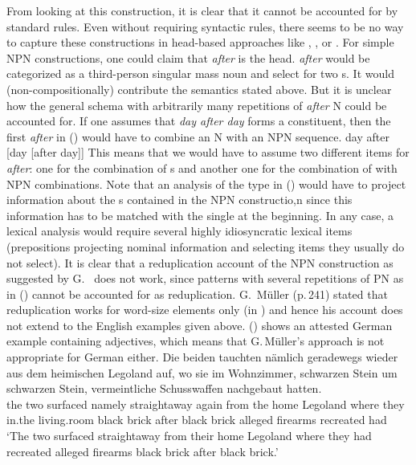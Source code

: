 \documentclass[output=paper
	        ,collection
	        ,collectionchapter
 	        ,biblatex
                ,babelshorthands
                ,newtxmath
                ,draftmode
                ,colorlinks, citecolor=brown
]{langscibook}
\begin{document}
From looking at this construction, it is clear that it cannot be accounted for by standard \xbar
rules. Even without requiring \xbar syntactic rules, there seems to be no way to capture these
constructions in head-based approaches like \minimalism, \cg, or \dg. For simple NPN constructions,
one could claim that \emph{after} is the head. \emph{after} would be categorized as a third-person singular
mass noun and select for two \nbar{}s. It would (non-compositionally) contribute the semantics stated above. But it is unclear how the general schema with arbitrarily
many repetitions of \emph{after} N could be accounted for. If one assumes that \emph{day after day}
forms a constituent, then the first \emph{after} in () would have to combine an N with an NPN sequence.
\ea
day after [day [after day]]
\z
This means that we would have to assume two different items for \emph{after}: one for the
combination of \nbar{}s and another one for the combination of \nbar with NPN combinations. Note
that an analysis of the type in () would have to project information about the \nbar{}s contained
in the NPN constructio,n since this information has to be matched with the single \nbar at the
beginning. In any case, a lexical analysis would require several highly idiosyncratic lexical items
(prepositions projecting nominal information and selecting items they usually do not select).
It is clear that a reduplication account of the NPN construction as suggested by
G.\ \citet{GMueller2011a} does not work, since patterns with several repetitions of PN as in
() cannot be accounted for as reduplication. G.\ Müller (p.\,241) stated that reduplication works
for word-size elements only (in ) and hence his account does not extend to the English
examples given above. () shows an attested German example containing adjectives, which means
that G.\,Müller's approach is not appropriate for German either.
\ea
\label{ex-schwarzen-stein}
\gll Die beiden tauchten nämlich geradewegs wieder aus dem heimischen Legoland auf, wo sie im
Wohnzimmer, schwarzen Stein um schwarzen Stein, vermeintliche Schusswaffen nachgebaut
hatten.\footnotemark\\
     the two    surfaced namely straightaway again   from the home Legoland \particle{} where they
     in.the living.room black brick after black brick alleged firearms recreated had\\%
{}
\glt `The two surfaced straightaway from their home Legoland where they had recreated alleged
firearms black brick after black brick.'
\z
\end{document}
